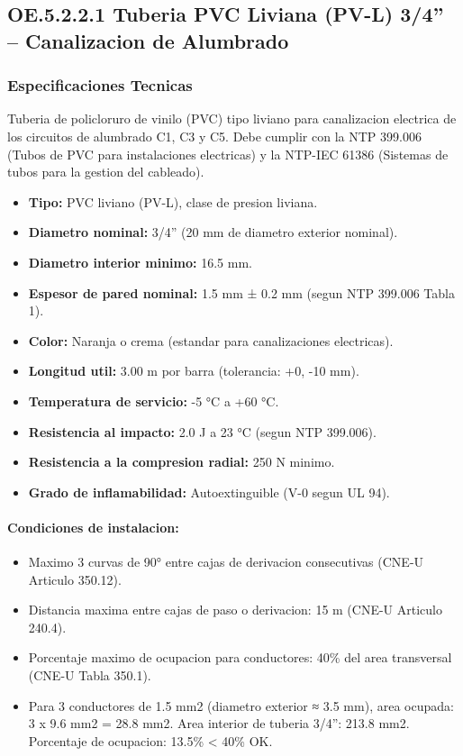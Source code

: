 \subsection{OE.5.2.2.1 Tuberia PVC Liviana (PV-L) 3/4'' -- Canalizacion de Alumbrado}

\subsubsection{Especificaciones Tecnicas}

Tuberia de policloruro de vinilo (PVC) tipo liviano para canalizacion electrica de los circuitos de alumbrado C1, C3 y C5. Debe cumplir con la NTP 399.006 (Tubos de PVC para instalaciones electricas) y la NTP-IEC 61386 (Sistemas de tubos para la gestion del cableado).

\begin{itemize}[nosep]
  \item \textbf{Tipo:} PVC liviano (PV-L), clase de presion liviana.
  \item \textbf{Diametro nominal:} 3/4'' (20 mm de diametro exterior nominal).
  \item \textbf{Diametro interior minimo:} 16.5 mm.
  \item \textbf{Espesor de pared nominal:} 1.5 mm ± 0.2 mm (segun NTP 399.006 Tabla 1).
  \item \textbf{Color:} Naranja o crema (estandar para canalizaciones electricas).
  \item \textbf{Longitud util:} 3.00 m por barra (tolerancia: +0, -10 mm).
  \item \textbf{Temperatura de servicio:} -5 °C a +60 °C.
  \item \textbf{Resistencia al impacto:} 2.0 J a 23 °C (segun NTP 399.006).
  \item \textbf{Resistencia a la compresion radial:} 250 N minimo.
  \item \textbf{Grado de inflamabilidad:} Autoextinguible (V-0 segun UL 94).
\end{itemize}

\paragraph{Condiciones de instalacion:}
\begin{itemize}[nosep]
  \item Maximo 3 curvas de 90° entre cajas de derivacion consecutivas (CNE-U Articulo 350.12).
  \item Distancia maxima entre cajas de paso o derivacion: 15 m (CNE-U Articulo 240.4).
  \item Porcentaje maximo de ocupacion para conductores: 40\% del area transversal (CNE-U Tabla 350.1).
  \item Para 3 conductores de 1.5 mm2 (diametro exterior ≈ 3.5 mm), area ocupada: 3 x 9.6 mm2 = 28.8 mm2. Area interior de tuberia 3/4'': 213.8 mm2. Porcentaje de ocupacion: 13.5\% < 40\% OK.
\end{itemize}

